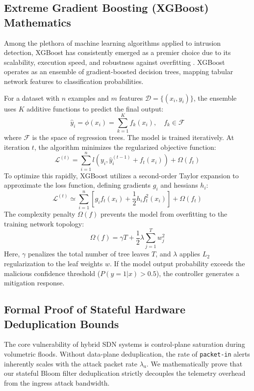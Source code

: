\documentclass[sigconf, nonacm]{acmart}
\begin{document}
\subsection{Extreme Gradient Boosting (XGBoost) Mathematics}
Among the plethora of machine learning algorithms applied to intrusion detection, XGBoost has consistently emerged as a premier choice due to its scalability, execution speed, and robustness against overfitting \cite{xgboost}. XGBoost operates as an ensemble of gradient-boosted decision trees, mapping tabular network features to classification probabilities.

For a dataset with $n$ examples and $m$ features $\mathcal{D} = \{(x_i, y_i)\}$, the ensemble uses $K$ additive functions to predict the final output:
\begin{equation}
\hat{y}_i = \phi(x_i) = \sum_{k=1}^K f_k(x_i), \quad f_k \in \mathcal{F}
\end{equation}
where $\mathcal{F}$ is the space of regression trees. The model is trained iteratively. At iteration $t$, the algorithm minimizes the regularized objective function:
\begin{equation}
\mathcal{L}^{(t)} = \sum_{i=1}^n l\left(y_i, \hat{y}_i^{(t-1)} + f_t(x_i)\right) + \Omega(f_t)
\end{equation}
To optimize this rapidly, XGBoost utilizes a second-order Taylor expansion to approximate the loss function, defining gradients $g_i$ and hessians $h_i$:
\begin{equation}
\mathcal{L}^{(t)} \simeq \sum_{i=1}^n \left[ g_i f_t(x_i) + \frac{1}{2} h_i f_t^2(x_i) \right] + \Omega(f_t)
\end{equation}
The complexity penalty $\Omega(f)$ prevents the model from overfitting to the training network topology:
\begin{equation}
\Omega(f) = \gamma T + \frac{1}{2}\lambda \sum_{j=1}^T w_j^2
\end{equation}
Here, $\gamma$ penalizes the total number of tree leaves $T$, and $\lambda$ applies $L_2$ regularization to the leaf weights $w$. If the model output probability exceeds the malicious confidence threshold ($P(y=1|x) > 0.5$), the controller generates a mitigation response.

\subsection{Formal Proof of Stateful Hardware Deduplication Bounds}
The core vulnerability of hybrid SDN systems is control-plane saturation during volumetric floods. Without data-plane deduplication, the rate of \texttt{packet-in} alerts inherently scales with the attack packet rate $\lambda_a$. We mathematically prove that our stateful Bloom filter deduplication strictly decouples the telemetry overhead from the ingress attack bandwidth.
\end{document}

